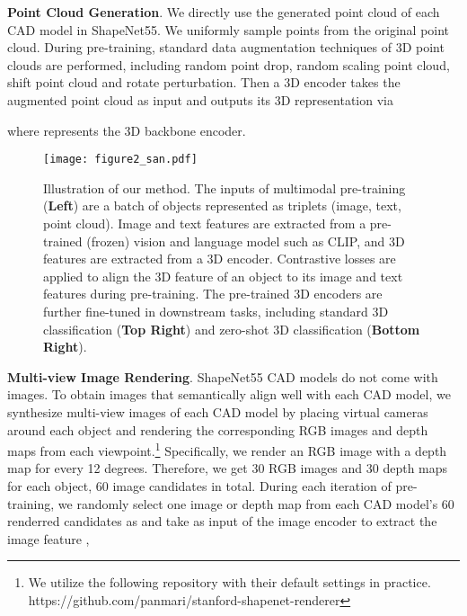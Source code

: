 \documentclass[10pt,twocolumn,letterpaper]{article}
\begin{document}
\noindent\textbf{Point Cloud Generation}. We directly use the generated point cloud of each CAD model in ShapeNet55. We uniformly sample  points from the original point cloud. During pre-training, standard data augmentation techniques of 3D point clouds are performed, including random point drop, random scaling point cloud, shift point cloud and rotate perturbation.
Then a 3D encoder takes the augmented point cloud  as input and outputs its 3D representation  via

where  represents the 3D backbone encoder.

\begin{figure*}[t]
    \centering
    \texttt{[image: figure2\_san.pdf]}
\caption{Illustration of our method. The inputs of multimodal pre-training (\textbf{Left}) are a batch of objects represented as triplets (image, text, point cloud). Image and text features are extracted from a pre-trained (frozen) vision and language model such as CLIP, and 3D features are extracted from a 3D encoder. Contrastive losses are applied to align the 3D feature of an object to its image and text features during pre-training. The pre-trained 3D encoders are further fine-tuned in downstream tasks, including standard 3D classification (\textbf{Top Right}) and zero-shot 3D classification (\textbf{Bottom Right}).}
    \label{fig:method}
\end{figure*}

\noindent\textbf{Multi-view Image Rendering}. ShapeNet55 CAD models do not come with images. 
To obtain images that semantically align well with each CAD model, we synthesize multi-view images of each CAD model by placing virtual cameras around each object and rendering the corresponding RGB images and depth maps from each viewpoint.\footnote{We utilize the following repository with their default settings in practice. \newline https://github.com/panmari/stanford-shapenet-renderer} Specifically, we render an RGB image with a depth map for every 12 degrees. Therefore, we get 30 RGB images and 30 depth maps for each object, 60 image candidates in total. During each iteration of pre-training, we randomly select one image or depth map from each CAD model's 60 renderred candidates as  and take  as input of the image encoder  to extract the image feature ,
\end{document}
